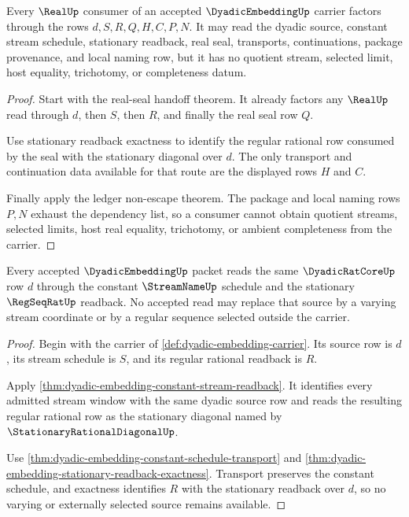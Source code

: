 \begin{theorem}
\label{thm:dyadic-embedding-real-seal-consumer-nonescape}
Every $\RealUp$ consumer of an accepted $\DyadicEmbeddingUp$ carrier factors through the rows $d,S,R,Q,H,C,P,N$. It may read the dyadic source, constant stream schedule, stationary readback, real seal, transports, continuations, package provenance, and local naming row, but it has no quotient stream, selected limit, host equality, trichotomy, or completeness datum.
\end{theorem}
\begin{proof}
Start with the real-seal handoff theorem. It already factors any $\RealUp$ read through $d$, then $S$, then $R$, and finally the real seal row $Q$.

Use stationary readback exactness to identify the regular rational row consumed by the seal with the stationary diagonal over $d$. The only transport and continuation data available for that route are the displayed rows $H$ and $C$.

Finally apply the ledger non-escape theorem. The package and local naming rows $P,N$ exhaust the dependency list, so a consumer cannot obtain quotient streams, selected limits, host real equality, trichotomy, or ambient completeness from the carrier.
\end{proof}

\begin{theorem}
\label{thm:dyadic-embedding-stationary-source-obligation}
Every accepted $\DyadicEmbeddingUp$ packet reads the same $\DyadicRatCoreUp$ row $d$ through the constant $\StreamNameUp$ schedule and the stationary $\RegSeqRatUp$ readback. No accepted read may replace that source by a varying stream coordinate or by a regular sequence selected outside the carrier.
\end{theorem}
\begin{proof}
Begin with the carrier of \autoref{def:dyadic-embedding-carrier}. Its source row is $d$, its stream schedule is $S$, and its regular rational readback is $R$.

Apply \autoref{thm:dyadic-embedding-constant-stream-readback}. It identifies every admitted stream window with the same dyadic source row and reads the resulting regular rational row as the stationary diagonal named by $\StationaryRationalDiagonalUp$.

Use \autoref{thm:dyadic-embedding-constant-schedule-transport} and \autoref{thm:dyadic-embedding-stationary-readback-exactness}. Transport preserves the constant schedule, and exactness identifies $R$ with the stationary readback over $d$, so no varying or externally selected source remains available.
\end{proof}

